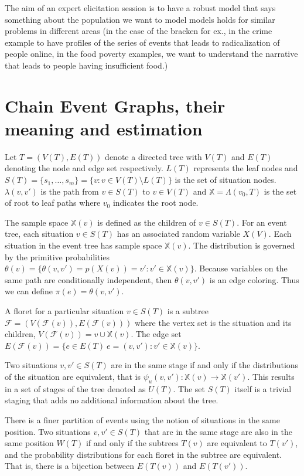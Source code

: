 \documentclass[12pt]{article}
\begin{document}
The aim of an expert elicitation session is to have a robust model that says something about the population we want to model
models holds for similar problems in different areas (in the case of the bracken for ex., in the crime example to have profiles of the series of events that leads to radicalization of people online, in the food poverty examples, we want to understand the narrative that leads to people having insufficient food.) 

\section{Chain Event Graphs, their meaning and estimation}

Let $T =( V(T),E(T))$ denote a directed tree with $V(T)$ and $E(T)$ denoting the node and edge set respectively. $L(T)$ represents the leaf nodes and $S(T) = \{s_1, \ldots, s_m\} =  \{v: v \in V(T) \setminus L(T)\}$ is the set of situation nodes. $\lambda (v,v')$ is the path from $v \in S(T)$ to $v \in V(T)$ and $\mathbb{X} = \Lambda(v_0,T) $ is the set of root to leaf paths where $v_0$ indicates the root node.  

The sample space $\mathbb{X}(v)$ is defined as the children of $v \in S(T)$. For an event tree, each situation $v \in S(T)$ has an associated random variable $X(V)$. Each situation in the event tree has sample space $\mathbb{X}(v)$. The distribution is governed by the primitive probabilities $\theta(v) = \{ \theta(v,v') = p(X(v)) = v' : v' \in \mathbb{X}(v)\}$. Because variables on the same path are conditionally independent, then $\theta(v,v')$ is an edge coloring. Thus we can define $\pi(e) = \theta(v,v')$.

A floret for a particular situation $v \in S(T)$ is a subtree $\mathcal{F} = (V(\mathcal{F}(v)), E(\mathcal{F}(v)))$ where the vertex set is the situation and its children, $V(\mathcal{F}(v)) = v \cup \mathbb{X}(v)$. The edge set $E(\mathcal{F}(v)) = \{ e \in E(T) \: e = (v,v') : v' \in \mathbb{X}(v) \}$. 

Two situations $v, v' \in S(T)$ are in the same stage if and only if the distributions of the situation are equivalent, that is $\psi_u(v,v') : \mathbb{X}(v) \to \mathbb{X}(v')$. This results in a set of stages of the tree denoted as $U(T)$. The set $S(T)$ itself is a trivial staging that adds no additional information about the tree. 

There is a finer partition of events using the notion of situations in the same position. Two situations $v, v' \in S(T)$ that are in the same stage are also in the same position $W(T)$ if and only if the subtrees $T(v)$ are equivalent to $T(v')$, and the probability distributions for each floret in the subtree are equivalent. That is, there is a bijection between $E(T(v))$ and $E(T(v'))$. 
\end{document}
